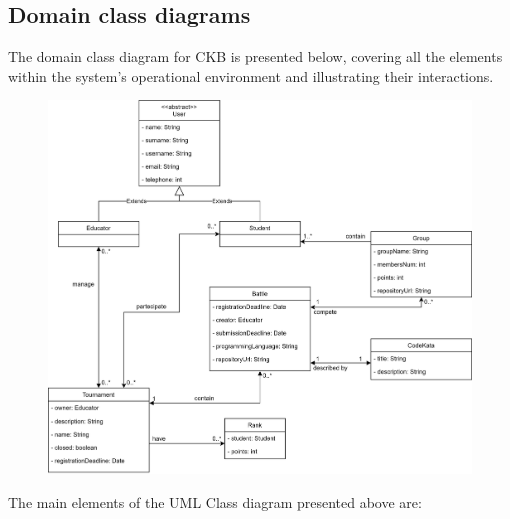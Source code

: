 \documentclass[12pt, a4paper]{report}
\begin{document}
    \subsection{Domain class diagrams}
    The domain class diagram for CKB is presented below, covering all the elements within the system's operational environment and illustrating their interactions.
    \begin{figure}[H]
        \centering
        \includegraphics[width=0.9\linewidth]{images/class.png}
    \end{figure}
    The main elements of the UML Class diagram presented above are: 
\end{document}

